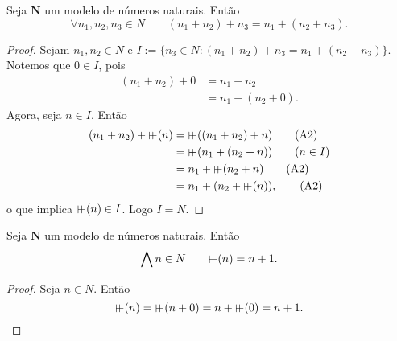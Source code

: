 \begin{theorem} \label{conj.nat.ass}
	Seja $\bm N$ um modelo de números naturais. Então
	\begin{equation*}
	\forall n_1,n_2,n_3 \in N \qquad (n_1+n_2)+n_3 = n_1+(n_2+n_3).
	\end{equation*}
\end{theorem}
\begin{proof}
	Sejam $n_1,n_2 \in N$ e $I := \{n_3 \in N: (n_1+n_2)+n_3 = n_1+(n_2+n_3)\}$. Notemos que $0 \in I$, pois
	\begin{align*}
	(n_1+n_2)+0 &= n_1+n_2						\tag{A1} \\
	&= n_1+(n_2+0).										\tag{A1}
	\end{align*}
	Agora, seja $n \in I$. Então
	\begin{align*}
	(n_1+n_2)+\suce(n) &= \suce((n_1+n_2)+n)			\tag{A2} \\
	&= \suce(n_1+(n_2+n)) 									\tag{$n \in I$}\\
	&= n_1+\suce(n_2+n)										\tag{A2} \\
	&= n_1+(n_2+\suce(n)),									\tag{A2} \\
	\end{align*}
o que implica $\suce(n) \in I$. Logo $I=N$.
\end{proof}

\begin{theorem} \label{conj.nat.suc}
	Seja $\bm N$ um modelo de números naturais. Então
	\begin{equation*}
	\forall n \in N \qquad \suce(n) = n+1.
	\end{equation*}
\end{theorem}
\begin{proof}
	Seja $n \in N$. Então
	\begin{equation*}
	\suce(n) = \suce(n+0)=n+\suce(0)=n+1.
	\end{equation*}
\end{proof}

